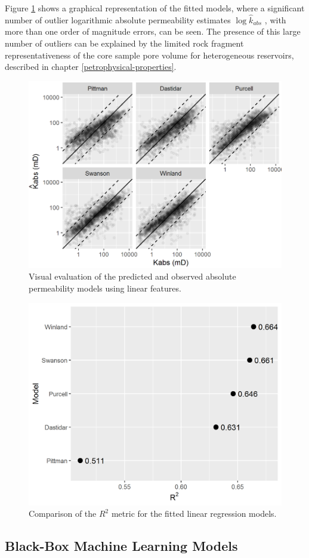 \documentclass[english,msc,numbers]{coppe}
\begin{document}
  Figure \ref{fig:linear-models} shows a graphical representation of the fitted models, where a significant number of outlier logarithmic absolute permeability estimates \(\log{\hat{k}_{abs}}\) , with more than one order of magnitude errors, can be seen. The presence of this large number of outliers can be explained by the limited rock fragment representativeness of the core sample pore volume for heterogeneous reservoirs, described in chapter \ref{petrophysical-properties}.
  \begin{figure}
  
  {\centering \includegraphics[width=0.75\linewidth]{figure/3-9-linear-models} 
  
  }
  
  \caption{Visual evaluation of the predicted and observed absolute permeability models using linear features.}\label{fig:linear-models}
  \end{figure}
  \begin{figure}
  
  {\centering \includegraphics[width=0.75\linewidth]{figure/3-10-linear-models-R2} 
  
  }
  
  \caption{Comparison of the $R^2$ metric for the fitted linear regression models.}\label{fig:linear-models-R2}
  \end{figure}
  \hypertarget{non-linear-regression}{%
  \subsection{Black-Box Machine Learning Models}\label{non-linear-regression}}
  
\end{document}
